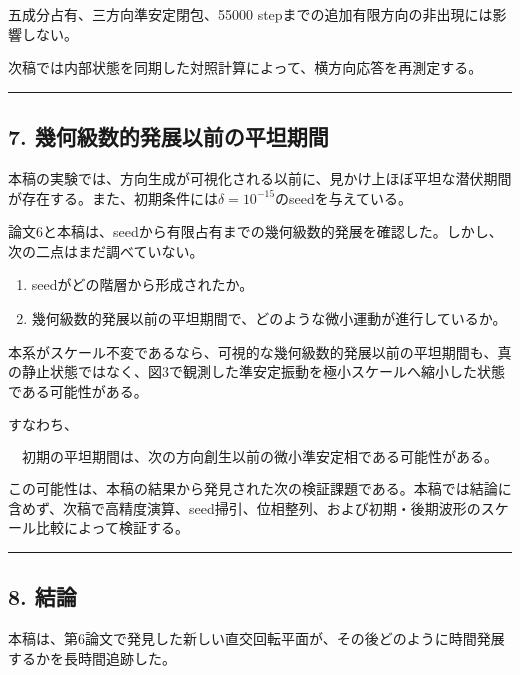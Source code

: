 \documentclass[
  a4paper,
]{ltjsarticle}
\providecommand{\tightlist}{%
  \setlength{\itemsep}{0pt}\setlength{\parskip}{0pt}}
\begin{document}
五成分占有、三方向準安定閉包、55000
stepまでの追加有限方向の非出現には影響しない。

次稿では内部状態を同期した対照計算によって、横方向応答を再測定する。

\begin{center}\rule{0.5\linewidth}{0.5pt}\end{center}

\subsection{7.
幾何級数的発展以前の平坦期間}\label{ux5e7eux4f55ux7d1aux6570ux7684ux767aux5c55ux4ee5ux524dux306eux5e73ux5766ux671fux9593}

本稿の実験では、方向生成が可視化される以前に、見かけ上ほぼ平坦な潜伏期間が存在する。また、初期条件には\(\delta=10^{-15}\)のseedを与えている。

論文6と本稿は、seedから有限占有までの幾何級数的発展を確認した。しかし、次の二点はまだ調べていない。

\begin{enumerate}
\def\labelenumi{\arabic{enumi}.}
\tightlist
\item
  seedがどの階層から形成されたか。
\item
  幾何級数的発展以前の平坦期間で、どのような微小運動が進行しているか。
\end{enumerate}

本系がスケール不変であるなら、可視的な幾何級数的発展以前の平坦期間も、真の静止状態ではなく、図3で観測した準安定振動を極小スケールへ縮小した状態である可能性がある。

すなわち、

\[
\boxed{
\text{初期の平坦期間は、次の方向創生以前の微小準安定相である可能性がある。}
}
\]

この可能性は、本稿の結果から発見された次の検証課題である。本稿では結論に含めず、次稿で高精度演算、seed掃引、位相整列、および初期・後期波形のスケール比較によって検証する。

\begin{center}\rule{0.5\linewidth}{0.5pt}\end{center}

\subsection{8. 結論}\label{ux7d50ux8ad6}

本稿は、第6論文で発見した新しい直交回転平面が、その後どのように時間発展するかを長時間追跡した。
\end{document}
